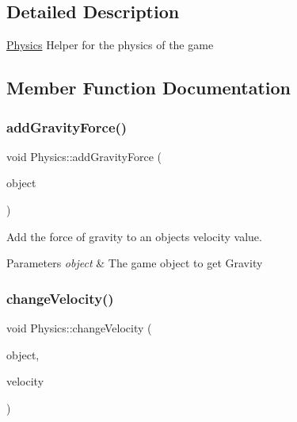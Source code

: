 \subsection{Detailed Description}
\mbox{\hyperlink{class_physics}{Physics}} Helper for the physics of the game 



\subsection{Member Function Documentation}
\mbox{\label{class_physics_a00639bda7da3c9e8c8b726de6104c64d}} 
\subsubsection{\texorpdfstring{add\+Gravity\+Force()}{addGravityForce()}}
{\footnotesize\ttfamily void Physics\+::add\+Gravity\+Force (\begin{DoxyParamCaption}\item[{shared\+\_\+ptr$<$ \mbox{\hyperlink{class_game_object}{Game\+Object}} $>$}]{object }\end{DoxyParamCaption})}



Add the force of gravity to an objects velocity value. 


\begin{DoxyParams}{Parameters}
{\em object} & The game object to get Gravity\\
\hline
\end{DoxyParams}
\mbox{\label{class_physics_a3baa430406c9017c1de92ed9c35dc9a2}} 
\subsubsection{\texorpdfstring{change\+Velocity()}{changeVelocity()}}
{\footnotesize\ttfamily void Physics\+::change\+Velocity (\begin{DoxyParamCaption}\item[{shared\+\_\+ptr$<$ \mbox{\hyperlink{class_game_object}{Game\+Object}} $>$}]{object,  }\item[{\mbox{\hyperlink{struct_vec2}{Vec2}}}]{velocity }\end{DoxyParamCaption})}




